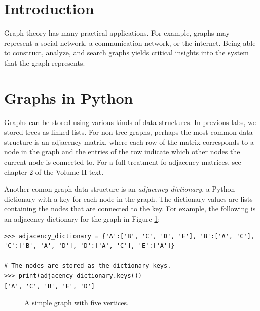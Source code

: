 \label{lab:SixDegreesKevinBacon}


\section*{Introduction}

Graph theory has many practical applications.
For example, graphs may represent a social network, a communication network, or the internet.
Being able to construct, analyze, and search graphs yields critical insights into the system that the graph represents.

\section*{Graphs in Python}

Graphs can be stored using various kinds of data structures.
In previous labs, we stored trees as linked lists.
For non-tree graphs, perhaps the most common data structure is an adjacency matrix, where each row of the matrix corresponds to a node in the graph and the entries of the row indicate which other nodes the current node is connected to.
For a full treatment fo adjacency matrices, see chapter 2 of the Volume II text.

Another comon graph data structure is an \emph{adjacency dictionary}, a Python dictionary with a key for each node in the graph.
The dictionary values are lists containing the nodes that are connected to the key.
For example, the following is an adjacency dictionary for the graph in Figure \ref{fig:simple_graph}:

\begin{lstlisting}
>>> adjacency_dictionary = {'A':['B', 'C', 'D', 'E'], 'B':['A', 'C'],
'C':['B', 'A', 'D'], 'D':['A', 'C'], 'E':['A']}

# The nodes are stored as the dictionary keys.
>>> print(adjacency_dictionary.keys())
['A', 'C', 'B', 'E', 'D']
\end{lstlisting}

\begin{figure}
\centering
{}
\caption{A simple graph with five vertices.}
\label{fig:simple_graph}
\end{figure}

